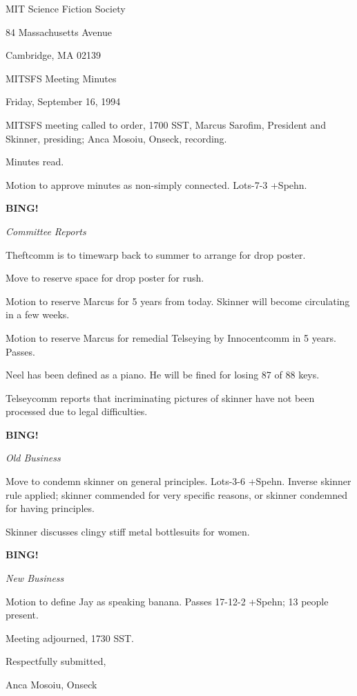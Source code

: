 \documentclass[12pt]{article}
\newcommand{\bing}{{\bf BING!} }
\newcommand{\goto}[1]{\bing \vskip 12pt \centerline{{\em{#1}}}}
\begin{document}
\begin{center}

MIT Science Fiction Society 

84 Massachusetts Avenue

Cambridge, MA 02139

\vspace{12pt}

MITSFS Meeting Minutes 

Friday, September 16, 1994

\end{center}
 
\vspace{18pt}

\setlength{\parskip}{6pt}

\noindent
MITSFS meeting called to order, 1700 SST,
Marcus Sarofim, President and Skinner, presiding; Anca Mosoiu, Onseck, recording.

Minutes read.

Motion to approve minutes as non-simply connected. Lots-7-3 +Spehn.

\goto{Committee Reports}

Theftcomm is to timewarp back to summer to arrange for drop poster.

Move to reserve space for drop poster for rush.

Motion to reserve Marcus for 5 years from today. Skinner will become circulating in a few weeks.

Motion to reserve Marcus for remedial Telseying by Innocentcomm in 5 years. Passes.

Neel has been defined as a piano. He will be fined for losing 87 of 88 keys.

Telseycomm reports that incriminating pictures of skinner have not been processed due to legal difficulties.

\goto{Old Business}

Move to condemn skinner on general principles. Lots-3-6 +Spehn. Inverse skinner rule applied; skinner commended for very specific reasons, or skinner condemned for having principles.

Skinner discusses clingy stiff metal bottlesuits for women.

\goto{New Business}

Motion to define Jay as speaking banana. Passes 17-12-2 +Spehn; 13 people present.

\vspace{12pt}

\noindent
Meeting adjourned, 1730 SST.

\vspace{18pt}

\centerline{Respectfully submitted,}
\centerline{Anca Mosoiu, Onseck}
\end{document}
